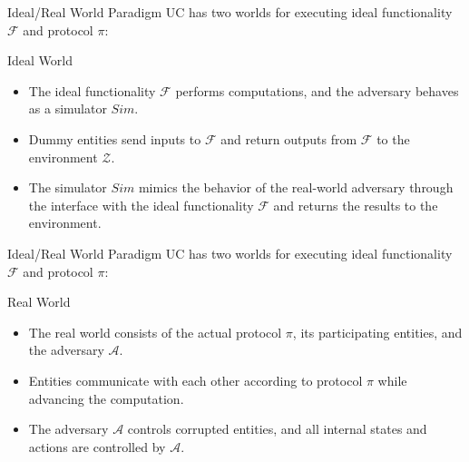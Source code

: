 \documentclass[aspectratio=169,10pt]{beamer}
\newenvironment{proofblock}[1][]
{\begin{block}{#1}\vspace{0.5em}}
{\vspace{0.5em}\end{block}}
\begin{document}
\begin{frame}{Ideal/Real World Paradigm}
    UC has two worlds for executing ideal functionality $\mathcal{F}$ and protocol $\pi$:

    \begin{proofblock}[Ideal World]
    \begin{itemize}
      \item The ideal functionality $\mathcal{F}$ performs computations, and the adversary behaves as a simulator $Sim$.
      \item Dummy entities send inputs to $\mathcal{F}$ and return outputs from $\mathcal{F}$ to the environment $\mathcal{Z}$.
      \item The simulator $Sim$ mimics the behavior of the real-world adversary through the interface with the ideal functionality $\mathcal{F}$ and returns the results to the environment.
    \end{itemize}
  \end{proofblock}
\end{frame}


\begin{frame}{Ideal/Real World Paradigm}
    UC has two worlds for executing ideal functionality $\mathcal{F}$ and protocol $\pi$:

  \begin{proofblock}[Real World]
    \begin{itemize}
      \item The real world consists of the actual protocol $\pi$, its participating entities, and the adversary $\mathcal{A}$.
      \item Entities communicate with each other according to protocol $\pi$ while advancing the computation.
      \item The adversary $\mathcal{A}$ controls corrupted entities, and all internal states and actions are controlled by $\mathcal{A}$.
    \end{itemize}
  \end{proofblock}
\end{frame}
\end{document}

